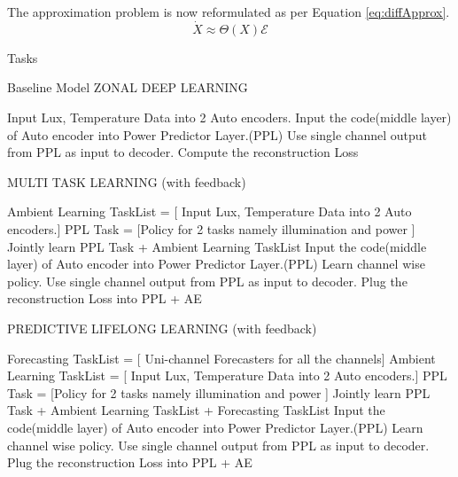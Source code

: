 The approximation problem is now reformulated as per Equation \ref{eq:diffApprox}.  
\begin{equation}
\dot{X} \approx \Theta(X)\mathcal{E}
\label{eq:diffApprox}
\end{equation}
 
 
 
Tasks 


    \begin{algorithm}
        \caption{ Baseline Model ZONAL DEEP LEARNING }
        \begin{algorithmic}[1]
            \STATE Input Lux, Temperature Data into 2 Auto encoders.
            \STATE Input the code(middle layer) of Auto encoder into Power Predictor Layer.(PPL)
            \STATE Use single channel output from PPL as input to decoder.
            \STATE Compute the reconstruction Loss 
        \end{algorithmic}
    \end{algorithm}



    \begin{algorithm}
        \caption{ MULTI TASK LEARNING  (with feedback)  }
        \begin{algorithmic}[1]
            \STATE Ambient Learning TaskList  = [ Input Lux, Temperature Data into 2 Auto encoders.]
            \STATE PPL Task = [Policy for 2 tasks namely illumination and power ]
            \STATE  Jointly learn PPL Task + Ambient Learning TaskList
            \STATE Input the code(middle layer) of Auto encoder into Power Predictor Layer.(PPL)
            \STATE Learn channel wise policy.
            \STATE Use single channel output from PPL as input to decoder.
            \STATE Plug the reconstruction Loss into PPL + AE 
            \EndWhile
        \end{algorithmic}
    \end{algorithm}
  	
	
    \begin{algorithm}
        \caption{ PREDICTIVE LIFELONG LEARNING  (with feedback)  }
        \begin{algorithmic}[1]
        \STATE   Forecasting TaskList  = [ Uni-channel Forecasters for all the channels]
          \STATE Ambient Learning TaskList  = [ Input Lux, Temperature Data into 2 Auto encoders.]
            \STATE PPL Task = [Policy for 2 tasks namely illumination and power ]
            \STATE  Jointly learn PPL Task + Ambient Learning TaskList + Forecasting TaskList
            \STATE Input the code(middle layer) of Auto encoder into Power Predictor Layer.(PPL)
            \STATE Learn channel wise policy.
            \STATE Use single channel output from PPL as input to decoder.
            \STATE Plug the reconstruction Loss into PPL + AE 
            \EndWhile
        \end{algorithmic}
    \end{algorithm}
    

